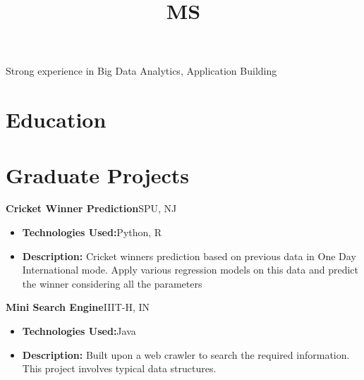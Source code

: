 \documentclass[11pt,a4paper,sans]{moderncv}        %
\title{MS} %
\begin{document}
\makecvtitle

\small{Strong experience in Big Data Analytics, Application Building}

\section{Education}
\vspace{5pt}



\vspace{2pt}



\vspace{6pt}

\section{Graduate Projects}
\vspace{5pt}

\textbf{Cricket Winner Prediction}\hfill{SPU, NJ}
\textit{}

\vspace{3pt}
\begin{itemize}
\item{\textbf{Technologies Used:}Python, R}
\item{\textbf{Description:} Cricket winners prediction based on previous data in One Day International mode. Apply various regression models on this data and predict the winner considering all the parameters}
\end{itemize}
\vspace{5pt}
\textbf{Mini Search Engine}\hfill{IIIT-H, IN}
\textit{}

\vspace{3pt}
\begin{itemize}
\item{\textbf{Technologies Used:}Java}
\item{\textbf{Description:} Built upon a web crawler to search the required information. This project involves typical data structures.}
\end{itemize}
\end{document}
